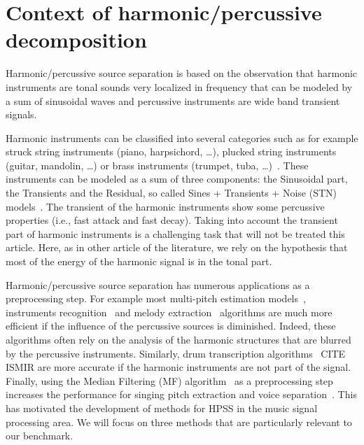 \section{Context of harmonic/percussive decomposition}
\label{sec:Background}

Harmonic/percussive source separation is based on the observation that harmonic instruments are tonal sounds very localized in frequency that can be modeled by a sum of sinusoidal waves and percussive instruments are wide band transient signals.

Harmonic instruments can be classified into several categories such as for example struck string instruments (piano, harpsichord, \ldots), plucked string instruments (guitar, mandolin, \ldots) or brass instruments (trumpet, tuba, \ldots)~\cite{peeters2003automatic}. These instruments can be modeled as a sum of three components: the Sinusoidal part, the Transients and the Residual, so called  Sines + Transients + Noise (STN) models~\cite{daudet2006review}. The transient of the harmonic instruments show some percussive properties (i.e., fast attack and fast decay). Taking into account the transient part of harmonic instruments is a challenging task that will not be treated this article. Here, as in other article of the literature, we rely on the hypothesis that most of the energy of the harmonic signal is in the tonal part. 

Harmonic/percussive source separation has numerous applications as a preprocessing step. For example most multi-pitch estimation models~\cite{klapuri2008multipitch}, instruments recognition~\cite{eronen2000musical} and melody extraction~\cite{salamon2012melody} algorithms are much more efficient if the influence of the percussive sources is diminished. Indeed, these algorithms often rely on the analysis of the harmonic structures that are blurred by the percussive instruments. Similarly, drum transcription algorithms~\cite{paulus2005drum} CITE ISMIR are more accurate if the harmonic instruments are not part of the signal. Finally, using the Median Filtering (MF) algorithm~\cite{fitzgerald2010harmonic} as a preprocessing step increases the performance for singing pitch extraction and voice separation~\cite{hsu2012tandem}. This has motivated the development of methods for HPSS in the music signal processing area. We will focus on three methods that are particularly relevant to our benchmark. 

